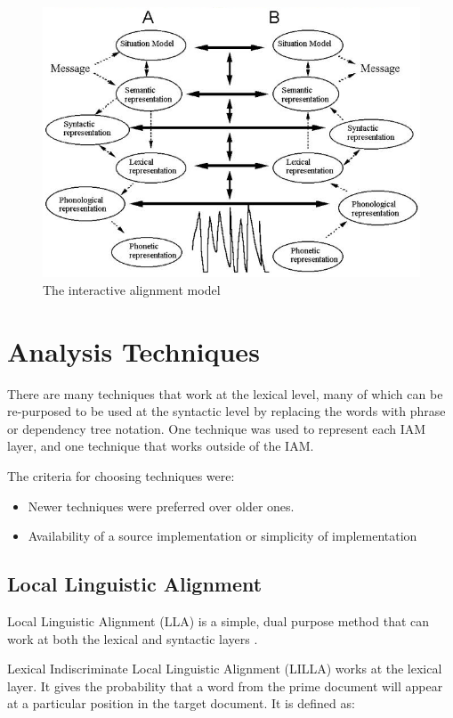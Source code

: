 \documentclass[conference]{IEEEtran}
\begin{document}
\begin{figure}
	\caption{The interactive alignment model}
	\includegraphics[width=\textwidth]{iam}
\end{figure}


\section{Analysis Techniques}

There are many techniques that work at the lexical level, many of which can be re-purposed to be used at the syntactic level by replacing the words with phrase or dependency tree notation. One technique was used to represent each IAM layer, and one technique that works outside of the IAM.

The criteria for choosing techniques were:

\begin{itemize}
	\item Newer techniques were preferred over older ones.
	\item Availability of a source implementation or simplicity of implementation
\end{itemize}


\subsection{Local Linguistic Alignment}
Local Linguistic Alignment (LLA) is a simple,  dual purpose method that can work at both the lexical and syntactic layers \cite{wang2014linguistic, xu2015evaluation}.

Lexical Indiscriminate Local Linguistic Alignment (LILLA) works at the lexical layer. It gives the probability that a word from the prime document will appear at a particular position in the target  document. It is defined as:
\end{document}
